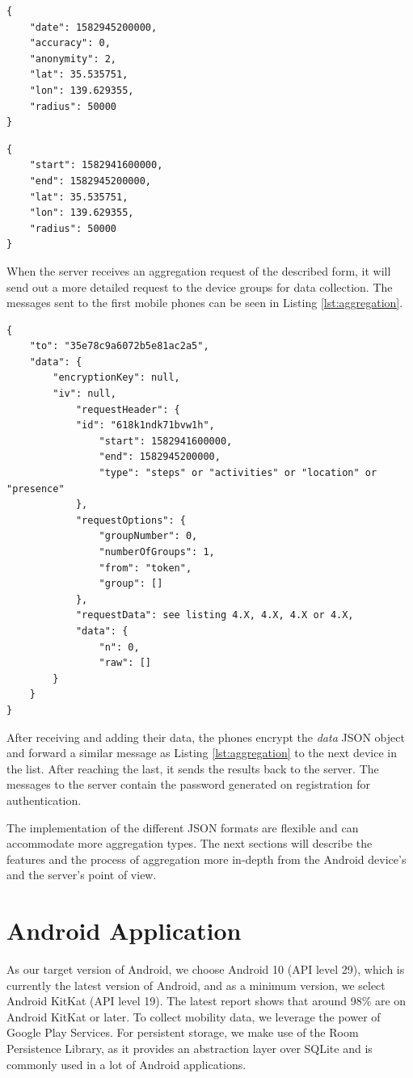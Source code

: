 \begin{lstlisting}[caption=Search options for locations, label={lst:locations}]
{
    "date": 1582945200000,
    "accuracy": 0,
    "anonymity": 2,
    "lat": 35.535751,
    "lon": 139.629355,
    "radius": 50000
}
\end{lstlisting}

\begin{lstlisting}[caption=Search options for presence, label={lst:presence}]
{
    "start": 1582941600000,
    "end": 1582945200000,
    "lat": 35.535751,
    "lon": 139.629355,
    "radius": 50000
}
\end{lstlisting}


When the server receives an aggregation request of the described form, it will send out a more detailed request to the device groups for data collection. The messages sent to the first mobile phones can be seen in Listing \ref{lst:aggregation}.

\begin{lstlisting}[caption=First aggregation request sent to the groups, label={lst:aggregation}]
{
	"to": "35e78c9a6072b5e81ac2a5",
	"data": {
		"encryptionKey": null,
		"iv": null,
            "requestHeader": {
			"id": "618k1ndk71bvw1h",
                "start": 1582941600000,
                "end": 1582945200000,
                "type": "steps" or "activities" or "location" or "presence"
            },
            "requestOptions": {
                "groupNumber": 0,
                "numberOfGroups": 1,
                "from": "token",
                "group": []
            },
            "requestData": see listing 4.X, 4.X, 4.X or 4.X,
            "data": {
                "n": 0,
                "raw": []
		}
	}
}
\end{lstlisting}

After receiving and adding their data, the phones encrypt the \textit{data} JSON object and forward a similar message as Listing \ref{lst:aggregation} to the next device in the list. After reaching the last, it sends the results back to the server. The messages to the server contain the password generated on registration for authentication.

The implementation of the different JSON formats are flexible and can accommodate more aggregation types. The next sections will describe the features and the process of aggregation more in-depth from the Android device's and the server's point of view.

\section{Android Application}
As our target version of Android, we choose Android 10 (API level 29), which is currently the latest version of Android, and as a minimum version, we select Android KitKat (API level 19). The latest report shows that around 98\% are on Android KitKat or later. To collect mobility data, we leverage the power of Google Play Services. For persistent storage, we make use of the Room Persistence Library, as it provides an abstraction layer over SQLite and is commonly used in a lot of Android applications.

